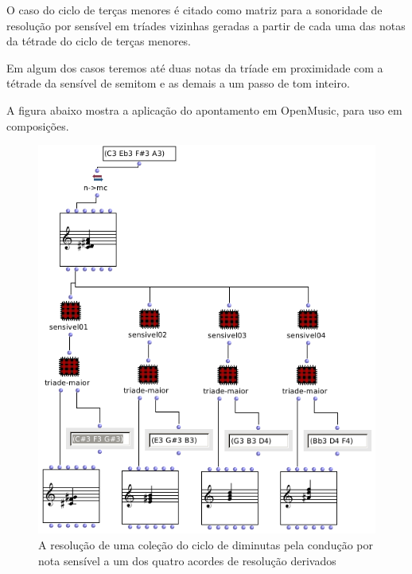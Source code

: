 \documentclass[
	12pt,				%
	openright,			%
	twoside,			%
	a4paper,			%
	english,			%
	french,				%
	spanish,			%
	brazil				%
	]{abntex2}
\begin{document}
O caso do ciclo de terças menores é citado como matriz para a sonoridade de resolução por sensível em tríades vizinhas geradas a partir de cada uma das notas da tétrade do ciclo de terças menores. 

Em algum dos casos teremos até duas notas da tríade em proximidade com a tétrade da sensível de semitom e as demais a um passo de tom inteiro. 

A figura abaixo mostra a aplicação do apontamento em OpenMusic, para uso em composições.
 

\begin{figure}[!h]
	\caption{\label{fig_grafico}A resolução de uma coleção do ciclo de diminutas pela condução por nota sensível a um dos quatro acordes de resolução derivados   }
	\begin{center}
	    \includegraphics[scale=0.6]{ciclos/sensivel.png}
	\end{center}
\end{figure}

\end{document}
